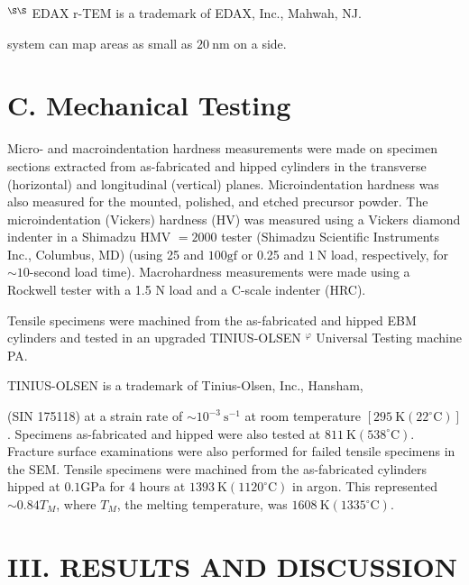 \documentclass[10pt]{article}
\begin{document}
${ }^{\S \S}$ EDAX r-TEM is a trademark of EDAX, Inc., Mahwah, NJ.

system can map areas as small as $20 \mathrm{~nm}$ on a side.

\section*{C. Mechanical Testing}
Micro- and macroindentation hardness measurements were made on specimen sections extracted from as-fabricated and hipped cylinders in the transverse (horizontal) and longitudinal (vertical) planes. Microindentation hardness was also measured for the mounted, polished, and etched precursor powder. The microindentation (Vickers) hardness (HV) was measured using a Vickers diamond indenter in a Shimadzu HMV $=2000$ tester (Shimadzu Scientific Instruments Inc., Columbus, MD) (using 25 and $100 \mathrm{gf}$ or 0.25 and $1 \mathrm{~N}$ load, respectively, for $\sim 10$-second load time). Macrohardness measurements were made using a Rockwell tester with a 1.5 $\mathrm{N}$ load and a C-scale indenter (HRC).

Tensile specimens were machined from the as-fabricated and hipped EBM cylinders and tested in an upgraded TINIUS-OLSEN ${ }^{\varphi}$ Universal Testing machine PA.

TINIUS-OLSEN is a trademark of Tinius-Olsen, Inc., Hansham,

(SIN 175118) at a strain rate of $\sim 10^{-3} \mathrm{~s}^{-1}$ at room temperature $\left[295 \mathrm{~K}\left(22^{\circ} \mathrm{C}\right)\right]$. Specimens as-fabricated and hipped were also tested at $811 \mathrm{~K}\left(538^{\circ} \mathrm{C}\right)$. Fracture surface examinations were also performed for failed tensile specimens in the SEM. Tensile specimens were machined from the as-fabricated cylinders hipped at $0.1 \mathrm{GPa}$ for 4 hours at $1393 \mathrm{~K}\left(1120^{\circ} \mathrm{C}\right)$ in argon. This represented $\sim 0.84 T_{M}$, where $T_{M}$, the melting temperature, was $1608 \mathrm{~K}\left(1335^{\circ} \mathrm{C}\right)$.

\section*{III. RESULTS AND DISCUSSION}
\end{document}
